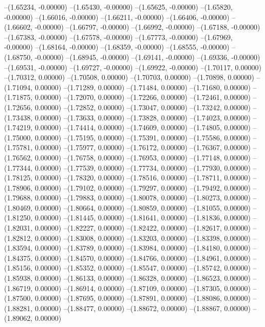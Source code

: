 --(1.65234, -0.00000)
--(1.65430, -0.00000)
--(1.65625, -0.00000)
--(1.65820, -0.00000)
--(1.66016, -0.00000)
--(1.66211, -0.00000)
--(1.66406, -0.00000)
--(1.66602, -0.00000)
--(1.66797, -0.00000)
--(1.66992, -0.00000)
--(1.67188, -0.00000)
--(1.67383, -0.00000)
--(1.67578, -0.00000)
--(1.67773, -0.00000)
--(1.67969, -0.00000)
--(1.68164, -0.00000)
--(1.68359, -0.00000)
--(1.68555, -0.00000)
--(1.68750, -0.00000)
--(1.68945, -0.00000)
--(1.69141, -0.00000)
--(1.69336, -0.00000)
--(1.69531, -0.00000)
--(1.69727, -0.00000)
--(1.69922, -0.00000)
--(1.70117, 0.00000)
--(1.70312, 0.00000)
--(1.70508, 0.00000)
--(1.70703, 0.00000)
--(1.70898, 0.00000)
--(1.71094, 0.00000)
--(1.71289, 0.00000)
--(1.71484, 0.00000)
--(1.71680, 0.00000)
--(1.71875, 0.00000)
--(1.72070, 0.00000)
--(1.72266, 0.00000)
--(1.72461, 0.00000)
--(1.72656, 0.00000)
--(1.72852, 0.00000)
--(1.73047, 0.00000)
--(1.73242, 0.00000)
--(1.73438, 0.00000)
--(1.73633, 0.00000)
--(1.73828, 0.00000)
--(1.74023, 0.00000)
--(1.74219, 0.00000)
--(1.74414, 0.00000)
--(1.74609, 0.00000)
--(1.74805, 0.00000)
--(1.75000, 0.00000)
--(1.75195, 0.00000)
--(1.75391, 0.00000)
--(1.75586, 0.00000)
--(1.75781, 0.00000)
--(1.75977, 0.00000)
--(1.76172, 0.00000)
--(1.76367, 0.00000)
--(1.76562, 0.00000)
--(1.76758, 0.00000)
--(1.76953, 0.00000)
--(1.77148, 0.00000)
--(1.77344, 0.00000)
--(1.77539, 0.00000)
--(1.77734, 0.00000)
--(1.77930, 0.00000)
--(1.78125, 0.00000)
--(1.78320, 0.00000)
--(1.78516, 0.00000)
--(1.78711, 0.00000)
--(1.78906, 0.00000)
--(1.79102, 0.00000)
--(1.79297, 0.00000)
--(1.79492, 0.00000)
--(1.79688, 0.00000)
--(1.79883, 0.00000)
--(1.80078, 0.00000)
--(1.80273, 0.00000)
--(1.80469, 0.00000)
--(1.80664, 0.00000)
--(1.80859, 0.00000)
--(1.81055, 0.00000)
--(1.81250, 0.00000)
--(1.81445, 0.00000)
--(1.81641, 0.00000)
--(1.81836, 0.00000)
--(1.82031, 0.00000)
--(1.82227, 0.00000)
--(1.82422, 0.00000)
--(1.82617, 0.00000)
--(1.82812, 0.00000)
--(1.83008, 0.00000)
--(1.83203, 0.00000)
--(1.83398, 0.00000)
--(1.83594, 0.00000)
--(1.83789, 0.00000)
--(1.83984, 0.00000)
--(1.84180, 0.00000)
--(1.84375, 0.00000)
--(1.84570, 0.00000)
--(1.84766, 0.00000)
--(1.84961, 0.00000)
--(1.85156, 0.00000)
--(1.85352, 0.00000)
--(1.85547, 0.00000)
--(1.85742, 0.00000)
--(1.85938, 0.00000)
--(1.86133, 0.00000)
--(1.86328, 0.00000)
--(1.86523, 0.00000)
--(1.86719, 0.00000)
--(1.86914, 0.00000)
--(1.87109, 0.00000)
--(1.87305, 0.00000)
--(1.87500, 0.00000)
--(1.87695, 0.00000)
--(1.87891, 0.00000)
--(1.88086, 0.00000)
--(1.88281, 0.00000)
--(1.88477, 0.00000)
--(1.88672, 0.00000)
--(1.88867, 0.00000)
--(1.89062, 0.00000)
